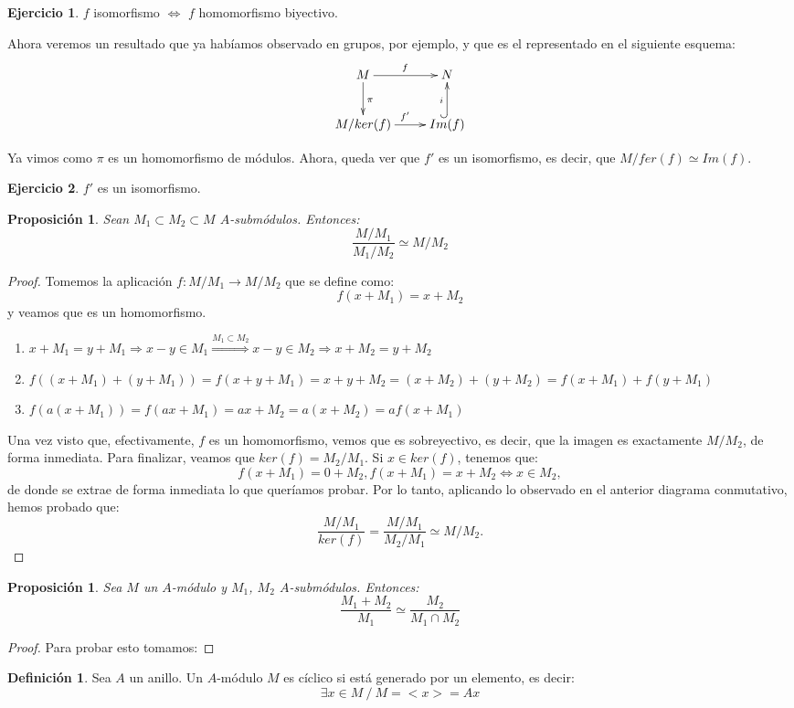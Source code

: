 \documentclass{article}
\theoremstyle{theorem-style}  %
\newtheorem{proposition}[theorem]{Proposición}
\theoremstyle{definition}
\newtheorem{definition}{Definición}[section]
\theoremstyle{example-style}
\newtheorem{exercise}{Ejercicio}[section]
\begin{document}
\begin{exercise}
	$f$ isomorfismo $\Leftrightarrow$ $f$ homomorfismo biyectivo.
\end{exercise}

Ahora veremos un resultado que ya habíamos observado en grupos, por ejemplo, y que es el representado en el siguiente esquema:
\[
\xymatrix{
	M \ar[d]^{\pi} \ar[r]^f & N \\
	M/ker(f) \ar[r]^{f'} & Im(f) \ar@{^{(}->}[u]^i
}
\]

Ya vimos como $\pi$ es un homomorfismo de módulos. Ahora, queda ver que $f'$ es un isomorfismo, es decir, que $M/fer(f)\simeq Im(f)$.
\begin{exercise}
	$f'$ es un isomorfismo.
\end{exercise}
\begin{proposition}
	Sean $M_1\subset M_2\subset M$ $A$-submódulos. Entonces:
	\[\frac{M/M_1}{M_1/M_2}\simeq M/M_2\]
\end{proposition}


\begin{proof}
	Tomemos la aplicación $f:M/M_1 \rightarrow M/M_2$ que se define como:
	\[f(x + M_1) = x + M_2\]
	y veamos que es un homomorfismo.
	\begin{enumerate}
		\item $x + M_1 = y + M_1 \Rightarrow x-y\in M_1  \stackrel{M_1\subset M_2}{\Rightarrow}  x-y \in M_2 \Rightarrow x + M_2 = y + M_2$
		\item $f((x+M_1)+(y + M_1)) = f(x+y+M_1) = x+y+M_2 = (x+M_2)+(y+M_2) = f(x+M_1) + f(y+M_1)$
		\item $f(a(x+M_1)) = f(ax + M_1) = ax + M_2 = a(x + M_2) = af(x+M_1)$
	\end{enumerate}
	Una vez visto que, efectivamente, $f$ es un homomorfismo, vemos que es sobreyectivo, es decir, que la imagen es exactamente $M/M_2$, de forma inmediata. Para finalizar, veamos que $ker(f) = M_2/M_1$. Si $x\in ker(f)$, tenemos que:
	\[f(x + M_1) = 0 + M_2, f(x + M_1) = x + M_2 \Leftrightarrow x \in M_2,\]
	de donde se extrae de forma inmediata lo que queríamos probar.
	Por lo tanto, aplicando lo observado en el anterior diagrama conmutativo, hemos probado que:
	\[\frac{M/M_1}{ker(f)} = \frac{M/M_1}{M_2/M_1} \simeq M/M_2.\]
\end{proof}

\begin{proposition}
	Sea $M$ un $A$-módulo y $M_1$, $M_2$ $A$-submódulos. Entonces:
	\[\frac{M_1+M_2}{M_1}\simeq \frac{M_2}{M_1\cap M_2}\]
\end{proposition}
\begin{proof}
	Para probar esto tomamos:
\end{proof}
\begin{definition}
	Sea $A$ un anillo. Un $A$-módulo $M$ es cíclico si está generado por un elemento, es decir:
	\[\exists x  \in M \ / \   M=<x>=Ax\]
\end{definition}
\end{document}
